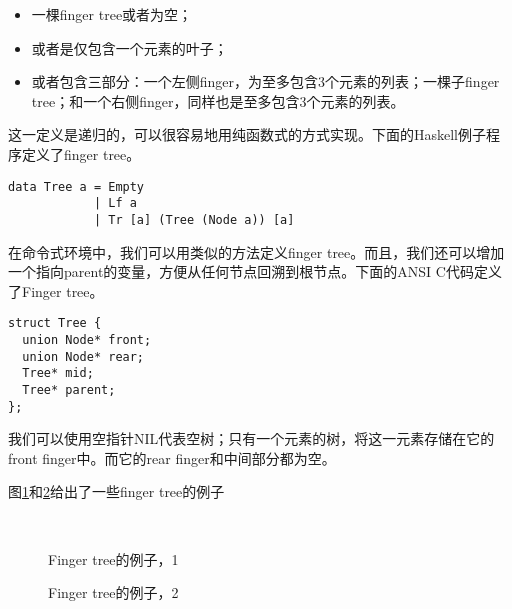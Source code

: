 \documentclass[UTF8]{article}
\begin{document}
\begin{itemize}
\item 一棵finger tree或者为空；
\item 或者是仅包含一个元素的叶子；
\item 或者包含三部分：一个左侧finger，为至多包含3个元素的列表；一棵子finger tree；和一个右侧finger，同样也是至多包含3个元素的列表。
\end{itemize}

这一定义是递归的，可以很容易地用纯函数式的方式实现。下面的Haskell例子程序定义了finger tree。

\lstset{language=Haskell}
\begin{lstlisting}
data Tree a = Empty
            | Lf a
            | Tr [a] (Tree (Node a)) [a]
\end{lstlisting}

在命令式环境中，我们可以用类似的方法定义finger tree。而且，我们还可以增加一个指向parent的变量，方便从任何节点回溯到根节点。下面的ANSI C代码定义了Finger tree。

\lstset{language=C}
\begin{lstlisting}
struct Tree {
  union Node* front;
  union Node* rear;
  Tree* mid;
  Tree* parent;
};
\end{lstlisting}

我们可以使用空指针NIL代表空树；只有一个元素的树，将这一元素存储在它的front finger中。而它的rear finger和中间部分都为空。

图\ref{fig:ftr-example-1}和\ref{fig:ftr-example-2}给出了一些finger tree的例子

\begin{figure}[htbp]
  \centering
   \\
  \caption{Finger tree的例子，1} \label{fig:ftr-example-1}
\end{figure}

\begin{figure}[htbp]
  \centering
  \hspace{0.2\textwidth}
  \caption{Finger tree的例子，2} \label{fig:ftr-example-2}
\end{figure}
\end{document}
